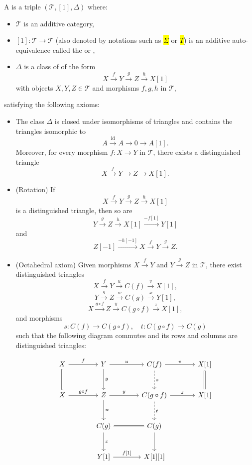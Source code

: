 
\begin{definition} \label{definition:triangulated_category}
A  is a triple $(\mathcal{T}, [1], \Delta)$ where:
\begin{itemize}
    \item $\mathcal{T}$ is an additive category,
    \item $[1]: \mathcal{T} \to \mathcal{T}$ (also denoted by notations such as \hl{$\Sigma$} or \hl{$T$}) is an additive auto-equivalence called the  or ,
    \item $\Delta$ is a class of  of the form
    $$X \xrightarrow{f} Y \xrightarrow{g} Z \xrightarrow{h} X[1]$$
    with objects $X,Y,Z \in \mathcal{T}$ and morphisms $f,g,h$ in $\mathcal{T}$,
\end{itemize}
satisfying the following axioms:

\begin{itemize}
    \item[(TR1)] The class $\Delta$ is closed under isomorphisms of triangles and contains the triangles isomorphic to
    $$A \xrightarrow{\mathrm{id}} A \to 0 \to A[1].$$
    Moreover, for every morphism $f: X \to Y$ in $\mathcal{T}$, there exists a distinguished triangle
    $$X \xrightarrow{f} Y \to Z \to X[1].$$

    \item[(TR2)] (Rotation) If 
    $$X \xrightarrow{f} Y \xrightarrow{g} Z \xrightarrow{h} X[1]$$
    is a distinguished triangle, then so are
    $$Y \xrightarrow{g} Z \xrightarrow{h} X[1] \xrightarrow{-f[1]} Y[1]$$
    and
    $$Z[-1] \xrightarrow{-h[-1]} X \xrightarrow{f} Y \xrightarrow{g} Z.$$

    \item[(TR3)] (Octahedral axiom) Given morphisms $X \xrightarrow{f} Y$ and $Y \xrightarrow{g} Z$ in $\mathcal{T}$, there exist distinguished triangles
    $$X \xrightarrow{f} Y \xrightarrow{u} C(f) \xrightarrow{v} X[1],$$
    $$Y \xrightarrow{g} Z \xrightarrow{w} C(g) \xrightarrow{x} Y[1],$$
    $$X \xrightarrow{g \circ f} Z \xrightarrow{y} C(g \circ f) \xrightarrow{z} X[1],$$
    and morphisms
    $$s: C(f) \to C(g \circ f), \quad t: C(g \circ f) \to C(g)$$
    such that the following diagram commutes and its rows and columns are distinguished triangles:

    $$\begin{tikzcd}[row sep=large, column sep=large]
    X \arrow{r}{f} \arrow[equal]{d} & Y \arrow{r}{u} \arrow{d}{g} & C(f) \arrow{r}{v} \arrow[dashed]{d}{s} & X[1] \arrow[equal]{d} \\
    X \arrow{r}{g \circ f} & Z \arrow{r}{y} \arrow{d}{w} & C(g \circ f) \arrow{r}{z} \arrow[dashed]{d}{t} & X[1] \\
    & C(g) \arrow[equal]{r} \arrow{d}{x} & C(g) \arrow{d} \\
    & Y[1] \arrow{r}{f[1]} & X[1][1]
    \end{tikzcd}$$


\end{itemize}
\end{definition}
